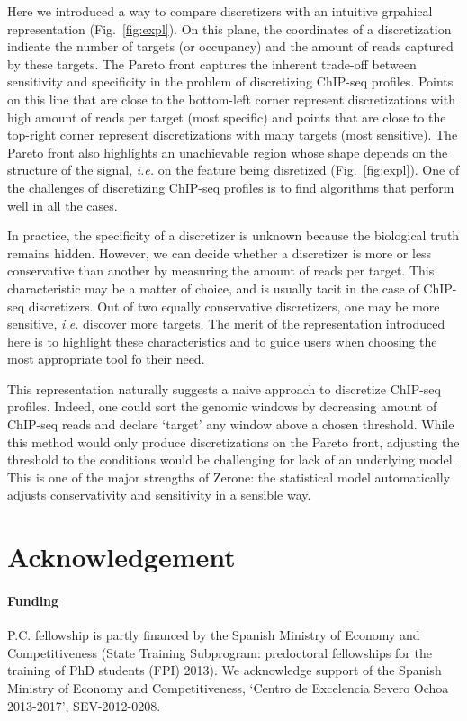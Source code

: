 \documentclass{bioinfo}
\begin{document}
Here we introduced a way to compare discretizers with an intuitive
grpahical representation (Fig.~\ref{fig:expl}). On this plane,
the coordinates of a discretization indicate the number of targets
(or occupancy) and the amount of reads captured by these targets.
The Pareto front captures the inherent trade-off between sensitivity
and specificity in the problem of discretizing ChIP-seq profiles.
Points on this line that are close to the bottom-left corner represent
discretizations with high amount of reads per target (most specific)
and points that are close to the top-right corner represent
discretizations with many targets (most sensitive). The Pareto front
also highlights an unachievable region whose shape depends on the
structure of the signal, \textit{i.e.} on the feature being disretized
(Fig.~\ref{fig:expl}). One of the challenges of discretizing ChIP-seq
profiles is to find algorithms that perform well in all the cases.

In practice, the specificity of a discretizer is unknown because
the biological truth remains hidden. However, we can decide whether
a discretizer is more or less conservative than another by measuring
the amount of reads per target. This characteristic may be a matter of
choice, and is usually tacit in the case of ChIP-seq discretizers.
Out of two equally conservative discretizers, one may be more sensitive,
\textit{i.e.} discover more targets. The merit of the representation
introduced here is to highlight these characteristics and to guide users
when choosing the most appropriate tool fo their need.

This representation naturally suggests a naive approach to discretize
ChIP-seq profiles. Indeed, one could sort the genomic windows by
decreasing amount of ChIP-seq reads and declare `target' any window
above a chosen threshold. While this method would only produce
discretizations on the Pareto front, adjusting the threshold to the
conditions would be challenging for lack of an underlying model.
This is one of the major strengths of Zerone: the statistical model
automatically adjusts conservativity and sensitivity in a sensible way.

\section*{Acknowledgement}

\paragraph{Funding\textcolon}
P.C. fellowship is partly financed by the Spanish Ministry of Economy and
Competitiveness (State Training Subprogram: predoctoral fellowships for the
training of PhD students (FPI) 2013).
We acknowledge support of the Spanish Ministry of Economy and Competitiveness,
`Centro de Excelencia Severo Ochoa 2013-2017', SEV-2012-0208.



\end{document}
